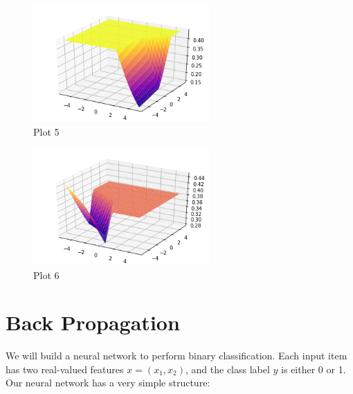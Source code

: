 \documentclass[a4paper]{article}
\theoremstyle{definition}
\newenvironment{soln}{
    \leavevmode\color{blue}\ignorespaces
}{}
\begin{document}
\begin{enumerate}
\begin{soln}
\begin{figure}[h!]
	        \centering
	        \includegraphics[width=0.6\textwidth]{Q4/Img5.png} 
	        \captionsetup{labelformat=empty}
	        \caption{Plot 5}
\end{figure}

\begin{figure}[h!]
	        \centering
	        \includegraphics[width=0.6\textwidth]{Q4/Img6.png} 
	        \captionsetup{labelformat=empty}
	        \caption{Plot 6}
\end{figure}


\end{soln}


\end{enumerate}

\clearpage

\section{Back Propagation}

We will build a neural network to perform binary classification.
Each input item has two real-valued features $x=(x_1, x_2)$, and the class label $y$ is either 0 or 1.
Our neural network has a very simple structure: 
\end{document}
